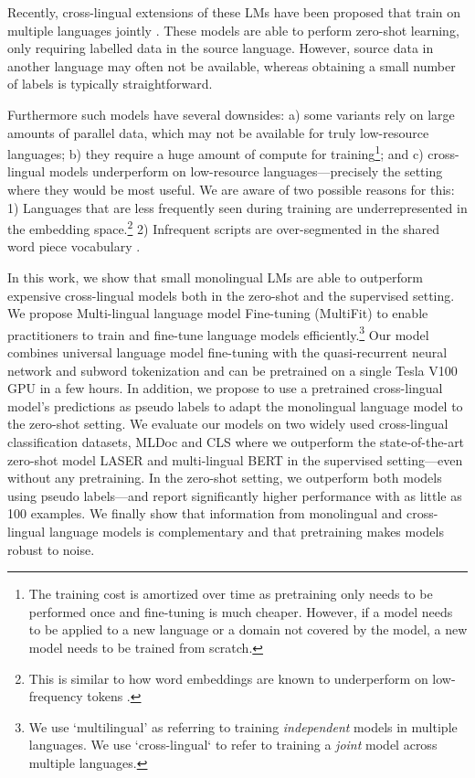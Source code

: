\documentclass[11pt,a4paper]{article}
\begin{document}
Recently, cross-lingual extensions of these LMs have been proposed that train on multiple languages jointly \cite{Artetxe2018e,Lample2019}. These models are able to perform zero-shot learning, only requiring labelled data in the source language. However, source data in another language may often not be available, whereas obtaining a small number of labels is typically straightforward.

Furthermore such models have several downsides: a) some variants rely on large amounts of parallel data, which may not be available for truly low-resource languages; b) they require a huge amount of compute for training\footnote{The training cost is amortized over time as pretraining only needs to be performed once and fine-tuning is much cheaper. However, if a model needs to be applied to a new language or a domain not covered by the model, a new model needs to be trained from scratch.}; and c) cross-lingual models underperform on low-resource languages---precisely the setting where they would be most useful.
We are aware of two possible reasons for this: 1) Languages that are less frequently seen during training are underrepresented in the embedding space.\footnote{This is similar to how word embeddings are known to underperform on low-frequency tokens \cite{Gong2018}.} 2) Infrequent scripts are over-segmented in the shared word piece vocabulary \cite{Wang2019}. 


In this work, we show that small monolingual LMs are able to outperform expensive cross-lingual models both in the zero-shot and the supervised setting. We propose Multi-lingual language model Fine-tuning (MultiFit) to enable practitioners to train and fine-tune language models efficiently.\footnote{We use `multilingual' as referring to training \emph{independent} models in multiple languages. We use `cross-lingual` to refer to training a \emph{joint} model across multiple languages.} Our model combines universal language model fine-tuning \cite[ULMFiT;][]{Howard2018} with the quasi-recurrent neural network \cite[QRNN;][]{Bradbury2017} and subword tokenization \cite{Kudo2018} and can be pretrained on a single Tesla V100 GPU in a few hours. In addition, we propose to use a pretrained cross-lingual model's predictions as pseudo labels to adapt the monolingual language model to the zero-shot setting. We evaluate our models on two widely used cross-lingual classification datasets, MLDoc \cite{Schwenk2018} and CLS \cite{Prettenhofer2010a} where we outperform the state-of-the-art zero-shot model LASER \cite{Artetxe2018e} and multi-lingual BERT \cite{Devlin2018} in the supervised setting---even without any pretraining. In the zero-shot setting, we outperform both models using pseudo labels---and report significantly higher performance with as little as 100 examples. We finally show that information from monolingual and cross-lingual language models is complementary and that pretraining makes models robust to noise.
\end{document}
